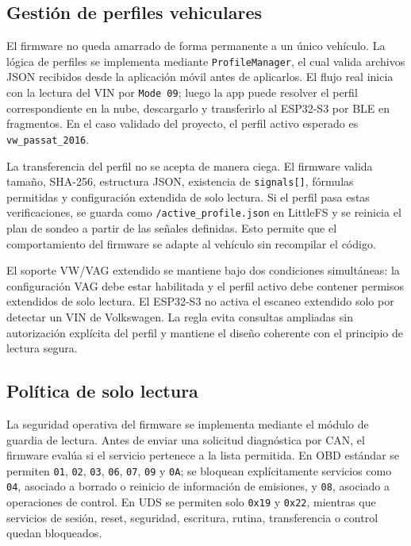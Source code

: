 \documentclass[12pt,letterpaper]{report}
\begin{document}
\subsection{Gestión de perfiles vehiculares}

El firmware no queda amarrado de forma permanente a un único vehículo. La lógica de perfiles se implementa mediante \texttt{ProfileManager}, el cual valida archivos JSON recibidos desde la aplicación móvil antes de aplicarlos. El flujo real inicia con la lectura del VIN por \texttt{Mode 09}; luego la app puede resolver el perfil correspondiente en la nube, descargarlo y transferirlo al ESP32-S3 por BLE en fragmentos. En el caso validado del proyecto, el perfil activo esperado es \texttt{vw\_passat\_2016}.

La transferencia del perfil no se acepta de manera ciega. El firmware valida tamaño, SHA-256, estructura JSON, existencia de \texttt{signals[]}, fórmulas permitidas y configuración extendida de solo lectura. Si el perfil pasa estas verificaciones, se guarda como \texttt{/active\_profile.json} en LittleFS y se reinicia el plan de sondeo a partir de las señales definidas. Esto permite que el comportamiento del firmware se adapte al vehículo sin recompilar el código.

El soporte VW/VAG extendido se mantiene bajo dos condiciones simultáneas: la configuración VAG debe estar habilitada y el perfil activo debe contener permisos extendidos de solo lectura. El ESP32-S3 no activa el escaneo extendido solo por detectar un VIN de Volkswagen. La regla evita consultas ampliadas sin autorización explícita del perfil y mantiene el diseño coherente con el principio de lectura segura.

\subsection{Política de solo lectura}

La seguridad operativa del firmware se implementa mediante el módulo de guardia de lectura. Antes de enviar una solicitud diagnóstica por CAN, el firmware evalúa si el servicio pertenece a la lista permitida. En OBD estándar se permiten \texttt{01}, \texttt{02}, \texttt{03}, \texttt{06}, \texttt{07}, \texttt{09} y \texttt{0A}; se bloquean explícitamente servicios como \texttt{04}, asociado a borrado o reinicio de información de emisiones, y \texttt{08}, asociado a operaciones de control. En UDS se permiten solo \texttt{0x19} y \texttt{0x22}, mientras que servicios de sesión, reset, seguridad, escritura, rutina, transferencia o control quedan bloqueados.
\end{document}
